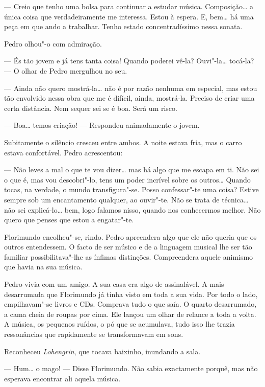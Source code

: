 --- Creio que tenho uma bolsa para continuar a estudar música.
Composição\ldots{} a única coisa que verdadeiramente me interessa. Estou à
espera. E, bem\ldots{} há uma peça em que ando a trabalhar. Tenho estado
concentradíssimo nessa sonata.

Pedro olhou"-o com admiração.

--- És tão jovem e já tens tanta coisa! Quando poderei vê-la?
Ouvi"-la\ldots{} tocá-la? --- O olhar de Pedro mergulhou no seu.

--- Ainda não quero mostrá-la\ldots{} não é por razão nenhuma em especial, mas
estou tão envolvido nessa obra que me é difícil, ainda, mostrá-la.
Preciso de criar uma certa distância. Nem sequer sei se é boa. Será um
risco.

--- Boa\ldots{} temos criação! --- Respondeu animadamente o jovem.

Subitamente o silêncio cresceu entre ambos. A noite estava fria, mas o
carro estava confortável. Pedro acrescentou:

--- Não leves a mal o que te vou dizer\ldots{} mas há algo que me escapa em ti.
Não sei o que é, mas vou descobri"-lo, tens um poder incrível sobre os
outros\ldots{} Quando tocas, na verdade, o mundo transfigura"-se. Posso
confessar"-te uma coisa? Estive sempre sob um encantamento qualquer, ao
ouvir"-te. Não se trata de técnica\ldots{} não sei explicá-lo\ldots{} bem, logo
falamos nisso, quando nos conhecermos melhor. Não quero que penses que
estou a engatar"-te.

Florimundo encolheu"-se, rindo. Pedro apreendera algo que ele não queria
que os outros entendessem. O facto de ser músico e de a linguagem
musical lhe ser tão familiar possibilitava"-lhe as ínfimas distinções.
Compreendera aquele animismo que havia na sua música.

Pedro vivia com um amigo. A sua casa era algo de assinalável. A mais
desarrumada que Florimundo já tinha visto em toda a sua vida. Por todo o
lado, empilhavam"-se livros e CDs. Comprava tudo o que saía. O quarto
desarrumado, a cama cheia de roupas por cima. Ele lançou um olhar de
relance a toda a volta. A música, os pequenos ruídos, o pó que se
acumulava, tudo isso lhe trazia ressonâncias que rapidamente se
transformavam em sons.

Reconheceu \emph{Lohengrin}, que tocava baixinho, inundando a sala.

--- Hum\ldots{} o mago! --- Disse Florimundo. Não sabia exactamente porquê, mas
não esperava encontrar ali aquela música.

